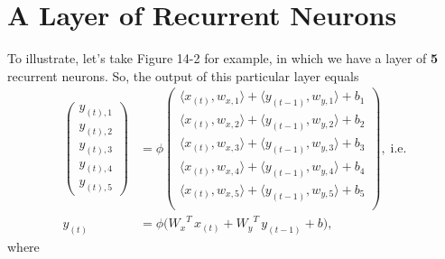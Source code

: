 \documentclass{article}
\begin{document}
\section{A Layer of Recurrent Neurons}
To illustrate, let's take Figure 14-2 for example, in which we have a layer of \textbf{5} recurrent neurons. So,
the output of this particular layer equals
\begin{align*}
  \begin{pmatrix}
    y_{(t), 1} \\
    y_{(t), 2} \\
    y_{(t), 3} \\
    y_{(t), 4} \\
    y_{(t), 5}
  \end{pmatrix}
  &= \phi
  \begin{pmatrix}
    \langle x_{(t)}, w_{x, 1} \rangle
    + \langle y_{(t-1)}, w_{y, 1} \rangle
    + b_1 \\
    \langle x_{(t)}, w_{x, 2} \rangle
    + \langle y_{(t-1)}, w_{y, 2} \rangle
    + b_2 \\
    \langle x_{(t)}, w_{x, 3} \rangle
    + \langle y_{(t-1)}, w_{y, 3} \rangle
    + b_3 \\
    \langle x_{(t)}, w_{x, 4} \rangle
    + \langle y_{(t-1)}, w_{y, 4} \rangle
    + b_4 \\
    \langle x_{(t)}, w_{x, 5} \rangle
    + \langle y_{(t-1)}, w_{y, 5} \rangle
    + b_5 \\
  \end{pmatrix}, \;\text{i.e.} \\
  y_{(t)} &= \phi\bigg(
    {W_{x}}^{T}\, x_{(t)} + {W_{y}}^{T}\, y_{(t-1)} + b
  \bigg),
\end{align*}
where
\end{document}
